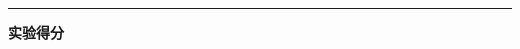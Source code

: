 \noindent\textcolor{fgraygreen}{\rule{\textwidth}{1.5pt} }

\noindent\textcolor{fgraygreen}{\textbf{实验得分}}

\scoresTable{}{}{}{}{}{}{}{}
	

	

\clearpage
\tableofcontents		